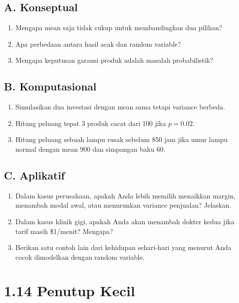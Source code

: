 \documentclass[
  letterpaper,
  DIV=11,
  numbers=noendperiod]{scrreprt}
\providecommand{\tightlist}{%
  \setlength{\itemsep}{0pt}\setlength{\parskip}{0pt}}
\begin{document}
\subsection{A. Konseptual}\label{a.-konseptual}

\begin{enumerate}
\def\labelenumi{\arabic{enumi}.}
\tightlist
\item
  Mengapa mean saja tidak cukup untuk membandingkan dua pilihan?
\item
  Apa perbedaan antara hasil acak dan random variable?
\item
  Mengapa keputusan garansi produk adalah masalah probabilistik?
\end{enumerate}

\subsection{B. Komputasional}\label{b.-komputasional}

\begin{enumerate}
\def\labelenumi{\arabic{enumi}.}
\tightlist
\item
  Simulasikan dua investasi dengan mean sama tetapi variance berbeda.
\item
  Hitung peluang tepat 3 produk cacat dari 100 jika \(p=0.02\).
\item
  Hitung peluang sebuah lampu rusak sebelum 850 jam jika umur lampu
  normal dengan mean 900 dan simpangan baku 60.
\end{enumerate}

\subsection{C. Aplikatif}\label{c.-aplikatif}

\begin{enumerate}
\def\labelenumi{\arabic{enumi}.}
\tightlist
\item
  Dalam kasus perusahaan, apakah Anda lebih memilih menaikkan margin,
  menambah modal awal, atau menurunkan variance penjualan? Jelaskan.
\item
  Dalam kasus klinik gigi, apakah Anda akan menambah dokter kedua jika
  tarif masih \$1/menit? Mengapa?
\item
  Berikan satu contoh lain dari kehidupan sehari-hari yang menurut Anda
  cocok dimodelkan dengan random variable.
\end{enumerate}

\section{1.14 Penutup Kecil}\label{penutup-kecil}
\end{document}
